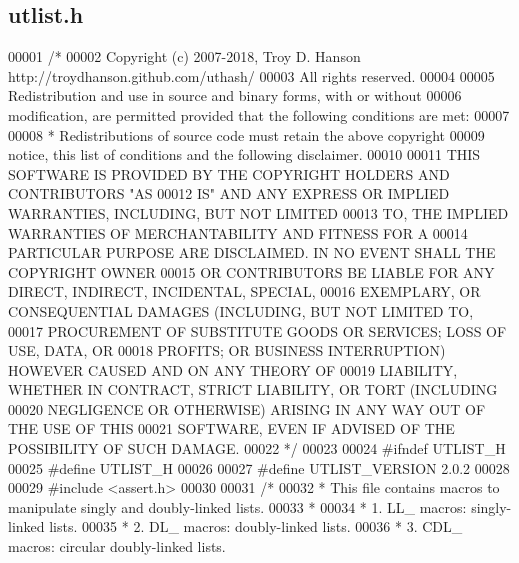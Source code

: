 \hypertarget{utlist_8h_source}{}\subsection{utlist.\+h}

\begin{DoxyCode}
00001 \textcolor{comment}{/*}
00002 \textcolor{comment}{Copyright (c) 2007-2018, Troy D. Hanson   http://troydhanson.github.com/uthash/}
00003 \textcolor{comment}{All rights reserved.}
00004 \textcolor{comment}{}
00005 \textcolor{comment}{Redistribution and use in source and binary forms, with or without}
00006 \textcolor{comment}{modification, are permitted provided that the following conditions are met:}
00007 \textcolor{comment}{}
00008 \textcolor{comment}{    * Redistributions of source code must retain the above copyright}
00009 \textcolor{comment}{      notice, this list of conditions and the following disclaimer.}
00010 \textcolor{comment}{}
00011 \textcolor{comment}{THIS SOFTWARE IS PROVIDED BY THE COPYRIGHT HOLDERS AND CONTRIBUTORS "AS}
00012 \textcolor{comment}{IS" AND ANY EXPRESS OR IMPLIED WARRANTIES, INCLUDING, BUT NOT LIMITED}
00013 \textcolor{comment}{TO, THE IMPLIED WARRANTIES OF MERCHANTABILITY AND FITNESS FOR A}
00014 \textcolor{comment}{PARTICULAR PURPOSE ARE DISCLAIMED. IN NO EVENT SHALL THE COPYRIGHT OWNER}
00015 \textcolor{comment}{OR CONTRIBUTORS BE LIABLE FOR ANY DIRECT, INDIRECT, INCIDENTAL, SPECIAL,}
00016 \textcolor{comment}{EXEMPLARY, OR CONSEQUENTIAL DAMAGES (INCLUDING, BUT NOT LIMITED TO,}
00017 \textcolor{comment}{PROCUREMENT OF SUBSTITUTE GOODS OR SERVICES; LOSS OF USE, DATA, OR}
00018 \textcolor{comment}{PROFITS; OR BUSINESS INTERRUPTION) HOWEVER CAUSED AND ON ANY THEORY OF}
00019 \textcolor{comment}{LIABILITY, WHETHER IN CONTRACT, STRICT LIABILITY, OR TORT (INCLUDING}
00020 \textcolor{comment}{NEGLIGENCE OR OTHERWISE) ARISING IN ANY WAY OUT OF THE USE OF THIS}
00021 \textcolor{comment}{SOFTWARE, EVEN IF ADVISED OF THE POSSIBILITY OF SUCH DAMAGE.}
00022 \textcolor{comment}{*/}
00023 
00024 \textcolor{preprocessor}{#ifndef UTLIST\_H}
00025 \textcolor{preprocessor}{#define UTLIST\_H}
00026 
00027 \textcolor{preprocessor}{#define UTLIST\_VERSION 2.0.2}
00028 
00029 \textcolor{preprocessor}{#include <assert.h>}
00030 
00031 \textcolor{comment}{/*}
00032 \textcolor{comment}{ * This file contains macros to manipulate singly and doubly-linked lists.}
00033 \textcolor{comment}{ *}
00034 \textcolor{comment}{ * 1. LL\_ macros:  singly-linked lists.}
00035 \textcolor{comment}{ * 2. DL\_ macros:  doubly-linked lists.}
00036 \textcolor{comment}{ * 3. CDL\_ macros: circular doubly-linked lists.}

\end{DoxyCode}
